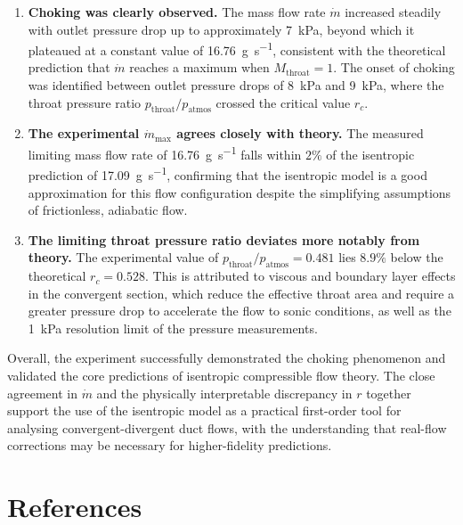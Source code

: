 \begin{enumerate}
    \item \textbf{Choking was clearly observed.} The mass flow rate \( \dot{m} \) increased steadily with outlet pressure drop up to approximately \qty{7}{\kPa}, beyond which it plateaued at a constant value of \qty{16.76}{\g\per\s}, consistent with the theoretical prediction that \( \dot{m} \) reaches a maximum when \( M_\text{throat} = 1 \). The onset of choking was identified between outlet pressure drops of \qty{8}{\kPa} and \qty{9}{\kPa}, where the throat pressure ratio \( p_\text{throat}/p_\text{atmos} \) crossed the critical value \( r_c \).

    \item \textbf{The experimental \( \dot{m}_\text{max} \) agrees closely with theory.} The measured limiting mass flow rate of \qty{16.76}{\g\per\s} falls within \( 2\% \) of the isentropic prediction of \qty{17.09}{\g\per\s}, confirming that the isentropic model is a good approximation for this flow configuration despite the simplifying assumptions of frictionless, adiabatic flow.

    \item \textbf{The limiting throat pressure ratio deviates more notably from theory.} The experimental value of \( p_\text{throat}/p_\text{atmos} = 0.481 \) lies \( 8.9\% \) below the theoretical \( r_c = 0.528 \). This is attributed to viscous and boundary layer effects in the convergent section, which reduce the effective throat area and require a greater pressure drop to accelerate the flow to sonic conditions, as well as the \qty{1}{\kPa} resolution limit of the pressure measurements.
\end{enumerate}

Overall, the experiment successfully demonstrated the choking phenomenon and validated the core predictions of isentropic compressible flow theory. The close agreement in \( \dot{m} \) and the physically interpretable discrepancy in \( r \) together support the use of the isentropic model as a practical first-order tool for analysing convergent-divergent duct flows, with the understanding that real-flow corrections may be necessary for higher-fidelity predictions.

\section{References} \label{sec:references}

\printbibliography[heading=none]

